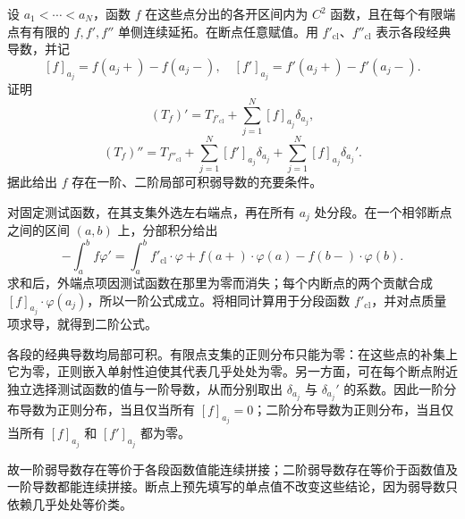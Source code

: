 \begin{exercise}\label{b1:ex:20-piecewise-jump-derivatives}
设 \(a_1<\cdots<a_N\)，函数 \(f\) 在这些点分出的各开区间内为 \(C^2\) 函数，且在每个有限端点有有限的 \(f,f',f''\) 单侧连续延拓。在断点任意赋值。用 \(f'_{\mathrm{cl}}\)、\(f''_{\mathrm{cl}}\) 表示各段经典导数，并记
\[
 [f]_{a_j}=f(a_j+)-f(a_j-),
 \quad [f']_{a_j}=f'(a_j+)-f'(a_j-).
\]
证明
\[
 (T_f)'=T_{f'_{\mathrm{cl}}}+\sum_{j=1}^N[f]_{a_j}\delta_{a_j},
\]
\[
 (T_f)''=T_{f''_{\mathrm{cl}}}
 +\sum_{j=1}^N[f']_{a_j}\delta_{a_j}
 +\sum_{j=1}^N[f]_{a_j}\delta_{a_j}'.
\]
据此给出 \(f\) 存在一阶、二阶局部可积弱导数的充要条件。
\end{exercise}
\begin{solution}
对固定测试函数，在其支集外选左右端点，再在所有 \(a_j\) 处分段。在一个相邻断点之间的区间 \((a,b)\) 上，分部积分给出
\[
 -\int_a^bf\varphi'
 =\int_a^bf'_{\mathrm{cl}}\cdot\varphi
 +f(a+)\cdot\varphi(a)-f(b-)\cdot\varphi(b).
\]
求和后，外端点项因测试函数在那里为零而消失；每个内断点的两个贡献合成 \([f]_{a_j}\cdot \varphi(a_j)\)，所以一阶公式成立。将相同计算用于分段函数 \(f'_{\mathrm{cl}}\)，并对点质量项求导，就得到二阶公式。

各段的经典导数均局部可积。有限点支集的正则分布只能为零：在这些点的补集上它为零，正则嵌入单射性迫使其代表几乎处处为零。另一方面，可在每个断点附近独立选择测试函数的值与一阶导数，从而分别取出 \(\delta_{a_j}\) 与 \(\delta_{a_j}'\) 的系数。因此一阶分布导数为正则分布，当且仅当所有 \([f]_{a_j}=0\)；二阶分布导数为正则分布，当且仅当所有 \([f]_{a_j}\) 和 \([f']_{a_j}\) 都为零。

故一阶弱导数存在等价于各段函数值能连续拼接；二阶弱导数存在等价于函数值及一阶导数都能连续拼接。断点上预先填写的单点值不改变这些结论，因为弱导数只依赖几乎处处等价类。
\end{solution}

